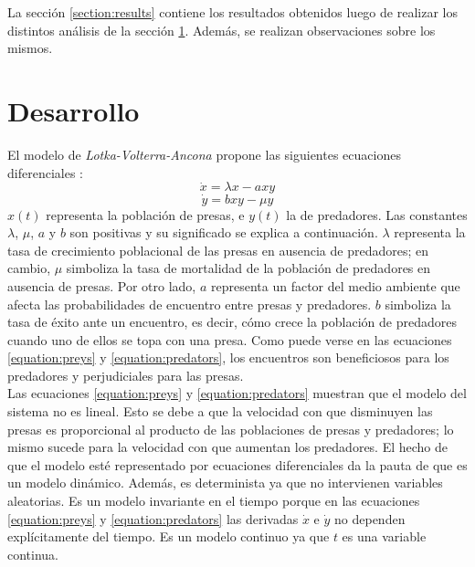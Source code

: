 \documentclass[journal, monochrome]{IEEEtran}
\begin{document}
La sección \ref{section:results} contiene los resultados obtenidos luego de realizar los distintos análisis de la sección \ref{section:development}. Además, se realizan observaciones sobre los mismos.\\

\section{Desarrollo}
\label{section:development}

El modelo de \textit{Lotka-Volterra-Ancona} propone las siguientes ecuaciones diferenciales \citep{berryman}:
\begin{equation}
\dot{x} = \lambda x - a x y
\label{equation:preys}
\end{equation}
\begin{equation}
\dot{y} = b x y - \mu y
\label{equation:predators}
\end{equation}
$x(t)$ representa la población de presas, e $y(t)$ la de predadores. Las constantes $\lambda$, $\mu$, $a$ y $b$ son positivas y su significado se explica a continuación. 
$\lambda$ representa la tasa de crecimiento poblacional de las presas en ausencia de predadores; en cambio, $\mu$ simboliza la tasa de mortalidad de la población de predadores 
en ausencia de presas. Por otro lado, $a$ representa un factor del medio ambiente que afecta las probabilidades de encuentro entre presas y predadores. $b$ simboliza la tasa de éxito 
ante un encuentro, es decir, cómo crece la población de predadores cuando uno de ellos se topa con una presa. Como puede verse en las ecuaciones \ref{equation:preys} y \ref{equation:predators}, 
los encuentros son beneficiosos para los predadores y perjudiciales para las presas.\\

Las ecuaciones \ref{equation:preys} y \ref{equation:predators} muestran que el modelo del sistema no es lineal. Esto se debe a que la velocidad con que disminuyen las presas es 
proporcional al producto de las poblaciones de presas y predadores; lo mismo sucede para la velocidad con que aumentan los predadores. El hecho de que el modelo esté representado 
por ecuaciones diferenciales da la pauta de que es un modelo dinámico. Además, es determinista ya que no intervienen variables aleatorias. Es un modelo invariante en el tiempo
porque en las ecuaciones \ref{equation:preys} y \ref{equation:predators} las derivadas $\dot{x}$ e $\dot{y}$ no dependen explícitamente del tiempo. Es un modelo
continuo ya que $t$ es una variable continua.\\
\end{document}
